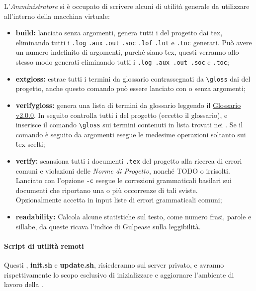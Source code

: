 \documentclass{scalatekids-article}
\begin{document}
\label{sec:script}
L'\textit{Amministratore} si è occupato di scrivere alcuni  di utilità
generale da utilizzare all'interno della macchina virtuale:
\begin{itemize}
\item\textbf{build:} lanciato senza argomenti, genera tutti i  del
  progetto dai \.tex, eliminando tutti i  \verb=.log= \verb=.aux= \verb=.out= \verb=.soc=
  \verb=.lof= \verb=.lot= e \verb=.toc=
  generati. Può avere un numero indefinito di argomenti, purché siano
   \.tex,
  questi verranno allo stesso modo generati eliminando tutti i 
  \verb=.log .aux .out .soc= e \verb=.toc=;
\item\textbf{extgloss:} estrae tutti i termini da glossario contrassegnati da
  \verb=\gloss= dai  del progetto, anche questo comando può essere lanciato con
  o senza argomenti;
\item\textbf{verifygloss:} genera una lista di termini da glossario leggendo il
   \href{run:../RP/Esterni/Glossario\_v2.0.0.pdf}{Glossario v2.0.0}. In seguito controlla tutti i  del
  progetto (eccetto il glossario), e inserisce il comando \verb=\gloss= sui termini
  contenuti in lista trovati nei . Se il comando è seguito da argomenti esegue le medesime
  operazioni soltanto sui  \.tex scelti;
\item\textbf{verify:} scansiona tutti i documenti \verb=.tex= del progetto alla
  ricerca di errori comuni e violazioni delle \textit{Norme di Progetto}, nonché
  TODO o  irrisolti. Lanciato con l'opzione \verb=-c=
  esegue le correzioni grammaticali basilari sui documenti che riportano una o
  più occorrenze di tali sviste.\\
  Opzionalmente accetta in input liste di errori grammaticali comuni;
\item\textbf{readability:} Calcola alcune statistiche sul testo, come numero
  frasi, parole e sillabe, da queste ricava l'indice di Gulpease sulla
  leggibilità.
\end{itemize}

\paragraph{Script di utilità remoti}

Questi , \textbf{init.sh} e \textbf{update.sh}, risiederanno sul server
privato, e avranno rispettivamente lo scopo esclusivo di inizializzare e
aggiornare l'ambiente di lavoro della .
\end{document}
